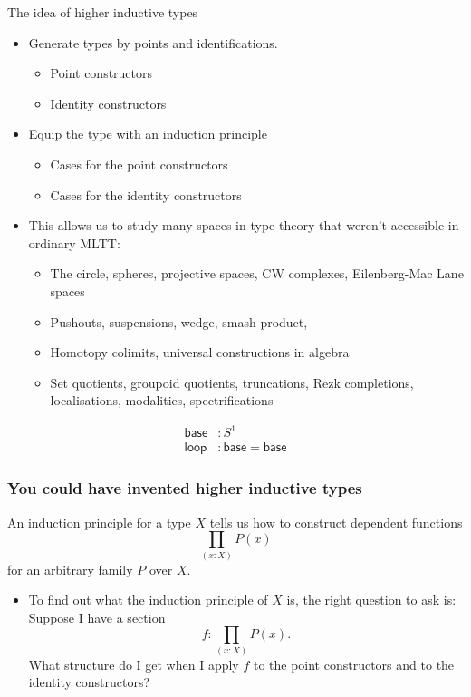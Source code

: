 \documentclass[handout]{beamer}
\newcommand{\sphere}[1]{S^{#1}}
\newcommand{\baseS}{\mathsf{base}}
\newcommand{\loopS}{\mathsf{loop}}
\newcommand{\apply}[2]{#1(#2)}
\begin{document}
\begin{frame}
  The idea of higher inductive types
  \begin{itemize}
  \item Generate types by points and identifications.
    \begin{itemize}
    \item Point constructors
    \item Identity constructors
    \end{itemize}\pause
  \item Equip the type with an induction principle
    \begin{itemize}
    \item Cases for the point constructors
    \item Cases for the identity constructors
    \end{itemize}\pause 
  \item This allows us to study many spaces in type theory that weren't accessible in ordinary MLTT:
    \begin{itemize}
    \item The circle, spheres, projective spaces, CW complexes, Eilenberg-Mac Lane spaces
    \item Pushouts, suspensions, wedge, smash product, 
    \item Homotopy colimits, universal constructions in algebra
    \item Set quotients, groupoid quotients, truncations, Rezk completions, localisations, modalities, spectrifications
    \end{itemize}
  \end{itemize}
\end{frame}

\begin{frame}
  \begin{align*}
    \baseS & : \sphere{1} \\
    \loopS & : \baseS=\baseS
  \end{align*}
\end{frame}

\begin{frame}
  \frametitle{You could have invented higher inductive types}
  An induction principle for a type $X$ tells us how to construct dependent functions
  \begin{equation*}
    \prod_{(x:X)}\apply{P}{x}
  \end{equation*}
  for an arbitrary family $P$ over $X$.\pause
  \begin{itemize}
  \item To find out what the induction principle of $X$ is, the right question to ask is: \\[1em]
    
    {\color{red}Suppose I have a section
      \begin{equation*}
        f:\prod_{(x:X)}\apply{P}{x}.  
      \end{equation*}
      What structure do I get when I apply $f$ to the point constructors and to the identity constructors?}
  \end{itemize}
\end{frame}
\end{document}
